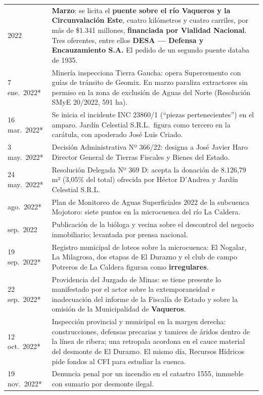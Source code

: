 \begin{longtable}{@{}p{2.7cm}p{10.3cm}@{}}
2022 & \textbf{Marzo}: se licita el \textbf{puente sobre el río Vaqueros y la Circunvalación Este}, cuatro kilómetros y cuatro carriles, por más de \$1.341 millones, \textbf{financiada por Vialidad Nacional}. Tres oferentes, entre ellos \textbf{DESA --- Defensa y Encauzamiento S.A.} El pedido de un segundo puente databa de 1935. \\
7 ene.\ 2022* & Minería inspecciona Tierra Gaucha: opera Supercemento con guías de tránsito de Geomix. En marzo paraliza extractores sin permiso en la zona de exclusión de Aguas del Norte (Resolución SMyE 20/2022, 591 ha). \\
16 mar.\ 2022* & Se inicia el incidente INC 23860/1 (``piezas pertenecientes'') en el amparo. Jardín Celestial S.R.L.\ figura como tercero en la carátula, con apoderado José Luis Criado. \\
3 may.\ 2022* & Decisión Administrativa Nº 366/22: designa a José Javier Haro Director General de Tierras Fiscales y Bienes del Estado. \\
24 may.\ 2022* & Resolución Delegada Nº 369 D: acepta la donación de 8.126,79 m² (3,05\% del total) ofrecida por Héctor D'Andrea\index{D'Andrea, Héctor} y Jardín Celestial S.R.L. \\
ago.\ 2022* & Plan de Monitoreo de Aguas Superficiales 2022 de la subcuenca Mojotoro: siete puntos en la microcuenca del río La Caldera. \\
sep.\ 2022 & Publicación de la bióloga y vecina sobre el descontrol del negocio inmobiliario; levantada por prensa nacional. \\
19 sep.\ 2022* & Registro municipal de loteos sobre la microcuenca: El Nogalar, La Milagrosa, dos etapas de El Durazno y el club de campo Potreros de La Caldera figuran como \textbf{irregulares}. \\
22 sep.\ 2022* & Providencia del Juzgado de Minas: se tiene presente lo manifestado por el actor sobre la extemporaneidad e inadecuación del informe de la Fiscalía de Estado y sobre la omisión de la Municipalidad de \textbf{Vaqueros}. \\
12 oct.\ 2022* & Inspección provincial y municipal en la margen derecha: construcciones, defensas precarias y tamices de áridos dentro de la línea de ribera; una retropala acordona en el cauce material del desmonte de El Durazno. El mismo día, Recursos Hídricos pide fondos al CFI para estudiar la cuenca. \\
19 nov.\ 2022* & Denuncia penal por un incendio en el catastro 1555, inmueble con sumario por desmonte ilegal. \\

\end{longtable}
